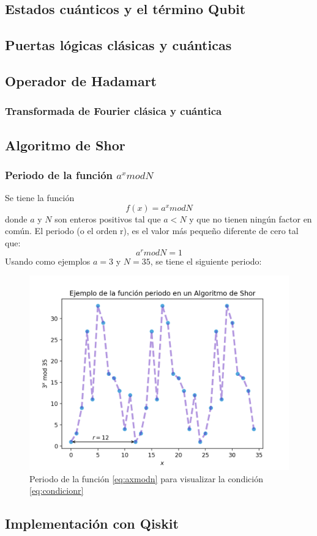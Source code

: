 \subsection{Estados cuánticos y el término Qubit}
\subsection{Puertas lógicas clásicas y cuánticas}
\subsection{Operador de Hadamart}
\subsubsection{Transformada de Fourier clásica y cuántica}
\subsection{Algoritmo de Shor}
\subsubsection{Periodo de la función $a^x mod N$}
Se tiene la función \begin{equation}
    f(x)=a^x mod N
    \label{eq:axmodn}
\end{equation}
donde $a$ y $N$ son enteros positivos tal que $a<N$ y que no tienen ningún factor en común. El periodo (o el orden r), es el valor más pequeño 
diferente de cero tal que:
\begin{equation}
    a^r mod N =1
    \label{eq:condicionr}
\end{equation}
Usando como ejemplos $a=3$ y $N=35$, se tiene el siguiente periodo:
\begin{figure}[H]
    \centering
    \includegraphics[scale=0.65]{../Graphics/period.png}
    \caption{Periodo de la función \ref{eq:axmodn} para visualizar la condición \ref{eq:condicionr}}
    \label{fig:condicionr}
\end{figure}
\subsection{Implementación con Qiskit}